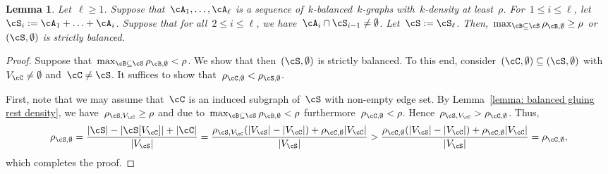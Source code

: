 \documentclass[11pt]{amsart}
\DeclarePairedDelimiter{\abs}{\lvert}{\rvert}
\newtheorem{lemma}[algocf]{Lemma}
\theoremstyle{definition}
\numberwithin{equation}{section}
\begin{document}
	\begin{lemma}\label{lemma: balanced gluing dense of strictly balanced}
		Let~$\ell\geq 1$.
		Suppose that~$\cA_1,\ldots,\cA_\ell$ is a sequence of~$k$-balanced~$k$-graphs with~$k$-density at least~$\rho$.
		For~$1\leq i\leq\ell$, let~$\cS_i:=\cA_1+\ldots+\cA_i$.
		Suppose that for all~$2\leq i\leq\ell$, we have~$\cA_i\cap \cS_{i-1}\neq\emptyset$.
		Let~$\cS:=\cS_\ell$.
		Then,~$\max_{\cB\subseteq \cS} \rho_{\cB,\emptyset}\geq \rho$ or~$(\cS,\emptyset)$ is strictly balanced.
	\end{lemma}
	\begin{proof}
		Suppose that~$\max_{\cB\subseteq \cS} \rho_{\cB,\emptyset}<\rho$.
		We show that then~$(\cS,\emptyset)$ is strictly balanced.
		To this end, consider~$(\cC,\emptyset)\subseteq (\cS,\emptyset)$ with~$V_\cC\neq\emptyset$ and~$\cC\neq\cS$.
		It suffices to show that~$\rho_{\cC,\emptyset}<\rho_{\cS,\emptyset}$.
		
		First, note that we may assume that~$\cC$ is an induced subgraph of~$\cS$ with non-empty edge set.
		By Lemma~\ref{lemma: balanced gluing rest density}, we have~$\rho_{\cS,V_\cC}\geq \rho$ and due to~$\max_{\cB\subseteq \cS} \rho_{\cB,\emptyset}<\rho$ furthermore~$\rho_{\cC,\emptyset}<\rho$.
		Hence~$\rho_{\cS,V_\cC}>\rho_{\cC,\emptyset}$.
		Thus,
		\begin{equation*}
			\rho_{\cS,\emptyset}
			=\frac{\abs{\cS}-\abs{\cS[V_\cC]}+\abs{\cC}}{\abs{V_\cS}}
			=\frac{ \rho_{\cS,V_\cC}(\abs{V_\cS}-\abs{V_\cC})+\rho_{\cC,\emptyset}\abs{V_\cC}}{\abs{V_\cS}}
			>\frac{ \rho_{\cC,\emptyset}(\abs{V_\cS}-\abs{V_\cC})+\rho_{\cC,\emptyset}\abs{V_\cC} }{\abs{V_\cS}}
			=\rho_{\cC,\emptyset},
		\end{equation*}
		which completes the proof.
	\end{proof}
	
\end{document}
